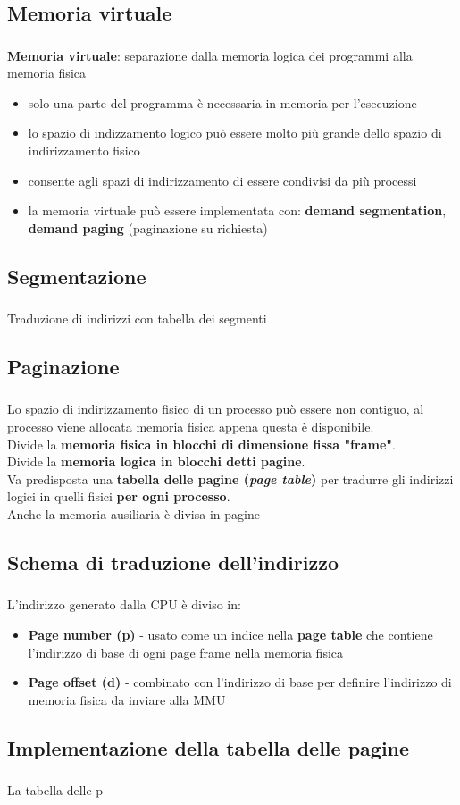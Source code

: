 \documentclass{beamer}
\newenvironment{mainframe}{
	\begin{frame}
		\frametitle{\insertsubsection}
		\framesubtitle{\insertsection}
	}{
	\end{frame}
}
\begin{document}
\subsection{Memoria virtuale}
\begin{mainframe}
	\textbf{Memoria virtuale}: separazione dalla memoria logica dei programmi alla memoria fisica
	\begin{itemize}
		\item solo una parte del programma è necessaria in memoria per l'esecuzione
		\item lo spazio di indizzamento logico può essere molto più grande dello spazio di indirizzamento fisico
		\item consente agli spazi di indirizzamento di essere condivisi da più processi
		\item la memoria virtuale può essere implementata con: \textbf{demand segmentation}, \textbf{demand paging} (paginazione su richiesta)
	\end{itemize}
\end{mainframe}
\subsection{Segmentazione}
\begin{mainframe}
	Traduzione di indirizzi con tabella dei segmenti
\end{mainframe}
\subsection{Paginazione}
\begin{mainframe}
	Lo spazio di indirizzamento fisico di un processo può essere non contiguo, al processo viene allocata memoria fisica appena questa è disponibile.\\
	Divide la \textbf{memoria fisica in blocchi di dimensione fissa "frame"}.\\
	Divide la \textbf{memoria logica in blocchi detti pagine}.\\
	Va predisposta una \textbf{tabella delle pagine (\textit{page table})} per tradurre gli indirizzi logici in quelli fisici \textbf{per ogni processo}.\\
	Anche la memoria ausiliaria è divisa in pagine
\end{mainframe}
\subsection{Schema di traduzione dell'indirizzo}
\begin{mainframe}
	L'indirizzo generato dalla CPU è diviso in:
	\begin{itemize}
		\item \textbf{Page number (p)} - usato come un indice nella \textbf{page table} che contiene l'indirizzo di base di ogni page frame nella memoria fisica
		\item \textbf{Page offset (d)} - combinato con l'indirizzo di base per definire l'indirizzo di memoria fisica da inviare alla MMU
	\end{itemize}
\end{mainframe}
\subsection{Implementazione della tabella delle pagine}
\begin{mainframe}
	La tabella delle p
\end{mainframe}
\end{document}
